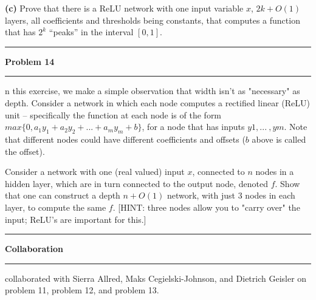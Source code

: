 \documentclass[11pt]{article}
\newcommand\question[2]{\vspace{.25in}\hrule\textbf{#1}\vspace{.5em}\hrule\vspace{.10in}}
\renewcommand\part[1]{\vspace{.10in}\textbf{(#1)}}
\begin{document}

\part{c} Prove that there is a ReLU network with one input variable $x$, $2k+O(1)$ layers, all coefficients and thresholds being constants, that computes a function that has $2^k$ ``peaks'' in the interval $[0,1]$.


\question{Problem 14}

In this exercise, we make a simple observation that width isn't as "necessary" as depth. Consider a network in which each node computes a rectified linear (ReLU) unit -- specifically the function at each node is of the form $max \{ 0,a_1y_1+a_2y_2+ ... +a_my_m + b \}$, for a node that has inputs $y1, ... \ ,ym$. Note that different nodes could have different coefficients and offsets ($b$ above is called the offset).

Consider a network with one (real valued) input $x$, connected to $n$ nodes in a hidden layer, which are in turn connected to the output node, denoted $f$. Show that one can construct a depth $n + O(1)$ network, with just 3 nodes in each layer, to compute the same $f$. [HINT: three nodes allow you to "carry over" the input; ReLU's are important for this.]


\newpage

\question{Collaboration}

I collaborated with Sierra Allred, Maks Cegielski-Johnson, and Dietrich Geisler on problem 11, problem 12, and problem 13. \newline
\end{document}
